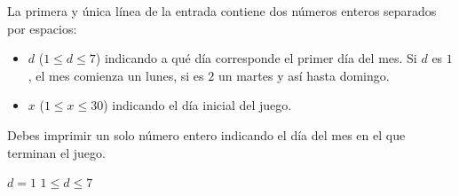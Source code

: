 \documentclass{oci}
\begin{document}
\begin{inputDescription}
  La primera y única línea de la entrada contiene dos números enteros separados por espacios:
  \begin{itemize}
    \item $d$ ($1 \leq d \leq 7$) indicando a qué día corresponde el primer día del mes. Si $d$ es $1$, el mes comienza un lunes, si es $2$ un martes y así hasta domingo.
    \item $x$ ($1 \leq x \leq 30$) indicando el día inicial del juego.
  \end{itemize}
\end{inputDescription}

\begin{outputDescription}
  Debes imprimir un solo número entero indicando el día del mes en el que terminan el juego.
\end{outputDescription}

\begin{scoreDescription}
  $d = 1$
  $1 \leq d \leq 7$
\end{scoreDescription}

\begin{sampleDescription}
\end{sampleDescription}
\end{document}
